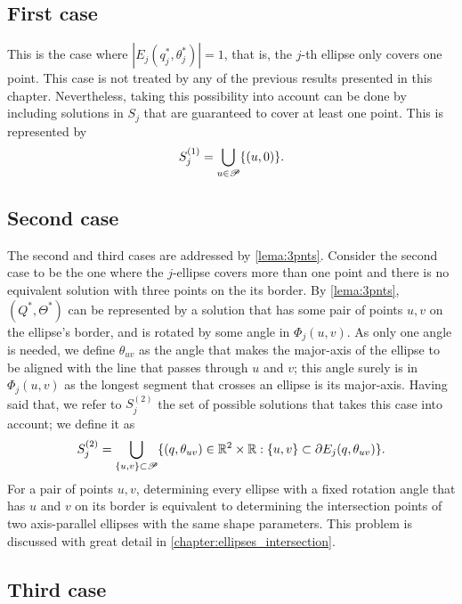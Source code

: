 \subsection{First case}

This is the case where $|E_j(q_j^*, \theta_j^*)|=1$, that is, the $j$-th ellipse only covers one point. 
This case is not treated by any of the previous results presented in this chapter. Nevertheless, taking this possibility into account can be done by including solutions in $S_j$ that are guaranteed to cover at least one point. This is represented by
\begin{equation}
	S_j^{(1)} = \bigcup_{u \in \mathscr{P}} \{(u, 0)\}.
\end{equation}

\subsection{Second case}

The second and third cases are addressed by \autoref{lema:3pnts}. 
Consider the second case to be the one where the $j$-ellipse covers more than one point and there is no equivalent solution with three points on the its border. 
By \autoref{lema:3pnts}, $(Q^*, \Theta^*)$ can be represented by a solution that has some pair of points $u, v$ on the ellipse's border, and is rotated by some angle in $\Phi_j(u,v)$. 
As only one angle is needed, we define $\theta_{uv}$ as the angle that makes the major-axis of the ellipse to be aligned with the line that passes through $u$ and $v$; this angle surely is in $\Phi_j(u,v)$ as the longest segment that crosses an ellipse is its major-axis.
Having said that, we refer to $S_j^{(2)}$ the set of possible solutions that takes this case into account; we define it as
\begin{equation}
S_j^{(2)} = \bigcup_{\{u, v\} \subset \mathscr{P}} \{(q, \theta_{uv})\in \mathbb{R}^2\times\mathbb{R}: \{u,v\} \subset \partial E_j(q, \theta_{uv})\}.\\
\end{equation}
For a pair of points $u, v$, determining every ellipse with a fixed rotation angle that has $u$ and $v$ on its border is equivalent to determining the intersection points of two axis-parallel ellipses with the same shape parameters. This problem is discussed with great detail in \autoref{chapter:ellipses_intersection}.

\subsection{Third case}

